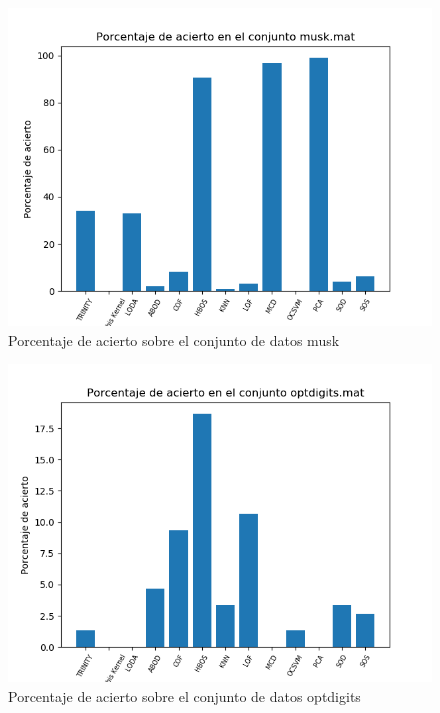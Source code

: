 \begin{figure}[H]
	\centering
	\label{musk_accuracy}
	\includegraphics[scale=0.7]{imagenes/imgs-exp1/accuracy/musk}
	\caption{Porcentaje de acierto sobre el conjunto de datos musk}
\end{figure}

\begin{figure}[H]
	\centering
	\label{optdigits_accuracy}
	\includegraphics[scale=0.7]{imagenes/imgs-exp1/accuracy/optdigits}
	\caption{Porcentaje de acierto sobre el conjunto de datos optdigits}
\end{figure}

